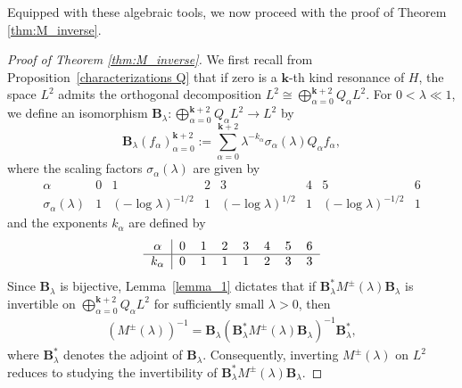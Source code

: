 \documentclass[reqno]{amsart}
\numberwithin{equation}{section}
\begin{document}
Equipped with these algebraic tools, we now proceed with the proof of Theorem \ref{thm:M_inverse}.

\begin{proof}[Proof of Theorem \ref{thm:M_inverse}]
We first recall from Proposition~\ref{characterizations Q} that if zero is a $\mathbf{k}$-th kind resonance of $H$, the space $L^2$ admits the orthogonal decomposition $L^2 \cong \bigoplus_{\alpha=0}^{\mathbf{k}+2} Q_\alpha L^2$.
	 For  $0<\lambda\ll1$, we define an isomorphism $\mathbf{B}_\lambda: \bigoplus_{\alpha=0}^{\mathbf{k}+2} Q_\alpha L^2 \to L^2$ by
	\[
\mathbf{B}_\lambda(f_\alpha)_{\alpha=0}^{\mathbf{k}+2} := \sum_{\alpha=0}^{\mathbf{k}+2} \lambda^{-k_\alpha} \sigma_\alpha(\lambda) Q_\alpha f_\alpha,
	\]
	where the scaling factors $\sigma_\alpha(\lambda)$ are given by	\begin{equation}\label{tab:sigma_alpha}
		\begin{array}{c|ccccccc}
			\alpha & 0 & 1 & 2 & 3 & 4 & 5 & 6 \\
			\hline
			\sigma_\alpha(\lambda) & 1 & (-\log \lambda)^{-1/2} & 1 & (-\log \lambda)^{1/2} & 1 & (-\log \lambda)^{-1/2} & 1
		\end{array}
	\end{equation}
	and the exponents $k_\alpha$ are defined by
    \begin{equation*}
\begin{tabular}{c|ccccccc}
    \( \alpha \)    & 0 & 1 & 2 & 3 & 4 & 5 & 6 \\
    \hline
    \( k_\alpha \)  & 0 & 1 & 1 & 1 & 2 & 3 & 3
\end{tabular}
\end{equation*}
	Since $\mathbf{B}_\lambda$ is bijective, Lemma~\ref{lemma_1} dictates that if $\mathbf{B}_\lambda^*M^{\pm}(\lambda) \mathbf{B}_\lambda$ is invertible on $\bigoplus_{\alpha=0}^{\mathbf{k}+2} Q_\alpha L^2$ for sufficiently small $\lambda > 0$, then
	\begin{align}\label{M-nin}
	(M^{\pm}(\lambda))^{-1} = \mathbf{B}_\lambda (\mathbf{B}_\lambda^* M^{\pm}(\lambda) \mathbf{B}_\lambda)^{-1} \mathbf{B}_\lambda^*,
	\end{align}
	where $\mathbf{B}_\lambda^*$ denotes the adjoint of
\(\mathbf B_\lambda\). 
	Consequently, inverting $M^\pm(\lambda)$ on $L^2$  reduces to studying the invertibility of $\mathbf{B}_\lambda^* M^\pm(\lambda) \mathbf{B}_\lambda$.
	

\end{proof}
\end{document}
